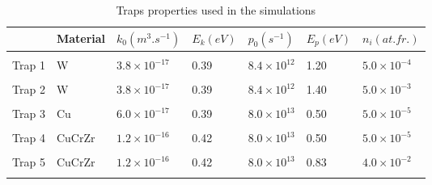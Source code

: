 \begin{table}
    \centering
    \begin{tabular}{L{1.5cm} L{1.5cm} R{1.6cm} R{1.1cm} R{1.6cm} R{1.1cm} R{2cm}}
         & Material & $k_0 (\si{m^3.s^{-1}})$ &  $E_k (\si{eV})$ & $p_0 (\si{s^{-1}})$ & $E_p (\si{eV})$ & $n_i (\si{at.fr.})$ \\
        \hline
        \\
        Trap 1 & W & $3.8 \times 10^{-17}$ & 0.39 & $8.4 \times 10^{12}$& 1.20 & $5.0 \times 10^{-4}$ \\
        \\
       Trap 2 & W & $3.8 \times 10^{-17}$ & 0.39 & $8.4 \times 10^{12}$& 1.40 & $5.0 \times 10^{-3}$ \\
        \\
        Trap 3 & Cu & $6.0 \times 10^{-17}$ & 0.39 & $8.0 \times 10^{13}$ & 0.50 &$5.0 \times 10^{-5}$\\
        \\
        Trap 4 & CuCrZr & $1.2\times 10^{-16}$ & 0.42 & $8.0 \times 10^{13}$ & 0.50 &$5.0 \times 10^{-5}$\\
        \\
        Trap 5 & CuCrZr & $1.2\times 10^{-16}$ & 0.42 & $8.0 \times 10^{13}$ & 0.83 &$4.0 \times 10^{-2}$\\
        \\
    \end{tabular}
    \caption{Traps properties used in the simulations \cite{hodille_macroscopic_2015, dolan_assessment_1994}}
    \label{tab:traps monoblock_1}
\end{table}






